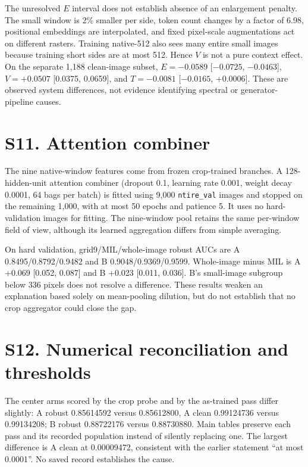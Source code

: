 \documentclass[letterpaper]{article}
\begin{document}
The unresolved $E$ interval does not establish absence of an enlargement penalty. The small window is 2\% smaller per side, token count changes by a factor of 6.98, positional embeddings are interpolated, and fixed pixel-scale augmentations act on different rasters. Training native-512 also sees many entire small images because training short sides are at most 512. Hence $V$ is not a pure context effect. On the separate 1,188 clean-image subset, $E=-0.0589$ [$-0.0725$, $-0.0463$], $V=+0.0507$ [0.0375, 0.0659], and $T=-0.0081$ [$-0.0165$, +0.0006]. These are observed system differences, not evidence identifying spectral or generator-pipeline causes.

\section{S11. Attention combiner}

The nine native-window features come from frozen crop-trained branches. A 128-hidden-unit attention combiner (dropout 0.1, learning rate 0.001, weight decay 0.0001, 64 bags per batch) is fitted using 9,000 \texttt{ntire\_val} images and stopped on the remaining 1,000, with at most 50 epochs and patience 5. It uses no hard-validation images for fitting. The nine-window pool retains the same per-window field of view, although its learned aggregation differs from simple averaging.

On hard validation, grid9/MIL/whole-image robust AUCs are A 0.8495/0.8792/0.9482 and B 0.9048/0.9369/0.9599. Whole-image minus MIL is A +0.069 [0.052, 0.087] and B +0.023 [0.011, 0.036]. B's small-image subgroup below 336 pixels does not resolve a difference. These results weaken an explanation based solely on mean-pooling dilution, but do not establish that no crop aggregator could close the gap.

\section{S12. Numerical reconciliation and thresholds}

The center arms scored by the crop probe and by the as-trained pass differ slightly: A robust 0.85614592 versus 0.85612800, A clean 0.99124736 versus 0.99134208; B robust 0.88722176 versus 0.88730880. Main tables preserve each pass and its recorded population instead of silently replacing one. The largest difference is A clean at 0.00009472, consistent with the earlier statement ``at most 0.0001''. No saved record establishes the cause.
\end{document}

